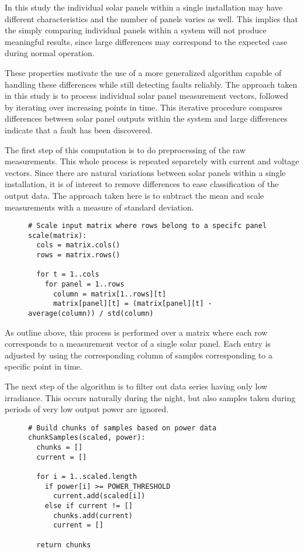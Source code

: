 In this study the individual solar panels within a single installation may have different characteristics and the number of panels varies as well.
This implies that the simply comparing individual panels within a system will not produce meaningful results, since large differences may correspond to the expected case during normal operation.

These properties motivate the use of a more generalized algorithm capable of handling these differences while still detecting faults reliably.
The approach taken in this study is to process individual solar panel measurement vectors, followed by iterating over increasing points in time.
This iterative procedure compares differences between solar panel outputs within the system and large differences indicate that a fault has been discovered.

The first step of this computation is to do preprocessing of the raw measurements.
This whole process is repeated separetely with current and voltage vectors.
Since there are natural variations between solar panels within a single installation, it is of interest to remove differences to ease classification of the output data.
The approach taken here is to subtract the mean and scale measurements with a measure of standard deviation.

\begin{figure}[H]
\begin{verbatim}
# Scale input matrix where rows belong to a specifc panel
scale(matrix):
  cols = matrix.cols()
  rows = matrix.rows()

  for t = 1..cols
    for panel = 1..rows
      column = matrix[1..rows][t]
      matrix[panel][t] = (matrix[panel][t] - average(column)) / std(column)
\end{verbatim}
\end{figure}

As outline above, this process is performed over a matrix where each row corresponds to a measurement vector of a single solar panel.
Each entry is adjusted by using the corresponding column of samples corresponding to a specific point in time.

The next step of the algorithm is to filter out data series having only low irradiance.
This occurs naturally during the night, but also samples taken during periods of very low output power are ignored.

\begin{figure}[H]
\begin{verbatim}
# Build chunks of samples based on power data
chunkSamples(scaled, power):
  chunks = []
  current = []

  for i = 1..scaled.length
    if power[i] >= POWER_THRESHOLD
      current.add(scaled[i])
    else if current != []
      chunks.add(current)
      current = []

  return chunks
\end{verbatim}
\end{figure}

